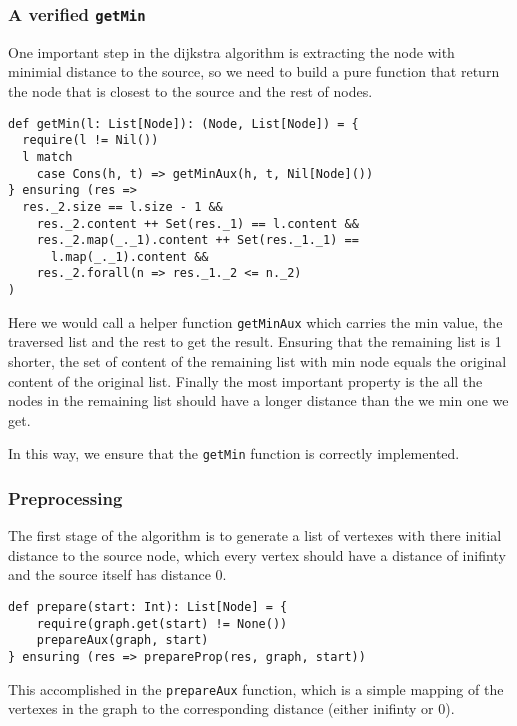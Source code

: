 \documentclass[11pt,a4paper]{article}
\begin{document}
\subsubsection{A verified \texttt{getMin}}

One important step in the dijkstra algorithm is extracting the node with
minimial distance to the source, so we need to build a pure function that
return the node that is closest to the source and the rest of nodes.

\begin{lstlisting}
def getMin(l: List[Node]): (Node, List[Node]) = {
  require(l != Nil())
  l match
    case Cons(h, t) => getMinAux(h, t, Nil[Node]())
} ensuring (res =>
  res._2.size == l.size - 1 &&
    res._2.content ++ Set(res._1) == l.content &&
    res._2.map(_._1).content ++ Set(res._1._1) == 
      l.map(_._1).content &&
    res._2.forall(n => res._1._2 <= n._2)
)
\end{lstlisting}

Here we would call a helper function \texttt{getMinAux} which carries the min value,
the traversed list and the rest to get the result. Ensuring that the remaining list
is 1 shorter, the set of content of the remaining list with min node equals the original
content of the original list. Finally the most important property is the all the nodes
in the remaining list should have a longer distance than the we min one we get.

In this way, we ensure that the \texttt{getMin} function is correctly implemented.

\subsubsection{Preprocessing}

The first stage of the algorithm is to generate a list of vertexes with there initial 
distance to the source node, which every vertex should have a distance of inifinty 
and the source itself has distance 0.

\begin{lstlisting}
def prepare(start: Int): List[Node] = {
    require(graph.get(start) != None())
    prepareAux(graph, start)
} ensuring (res => prepareProp(res, graph, start))
\end{lstlisting}

This accomplished in the \texttt{prepareAux} function, which is a simple mapping of
the vertexes in the graph to the corresponding distance (either inifinty or 0).
\end{document}
